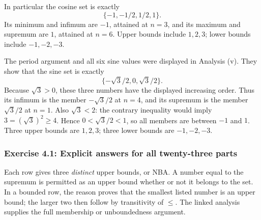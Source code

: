 In particular the cosine set is exactly
\[
 \{-1,-1/2,1/2,1\}.
\]
Its minimum and infimum are $-1$, attained at $n=3$, and its
maximum and supremum are $1$, attained at $n=6$. Upper bounds
include $1,2,3$; lower bounds include $-1,-2,-3$.

\label{bounds:w}
The period argument and all six sine values were displayed in
Analysis (v). They show that the sine set is exactly
\[
 \{-\sqrt3/2,0,\sqrt3/2\}.
\]
Because $\sqrt3>0$, these three numbers have the displayed
increasing order. Thus its infimum is the member $-\sqrt3/2$
at $n=4$, and its supremum is the member $\sqrt3/2$ at $n=1$.
Also $\sqrt3<2$: the contrary inequality would imply
$3=(\sqrt3)^2\geq4$. Hence $0<\sqrt3/2<1$, so all members
are between $-1$ and $1$. Three upper bounds are $1,2,3$;
three lower bounds are $-1,-2,-3$.

\subsubsection*{Exercise 4.1: Explicit answers for all twenty-three parts}

Each row gives three \emph{distinct} upper bounds, or NBA. A number
equal to the supremum is permitted as an upper bound whether or not
it belongs to the set. In a bounded row, the reason proves that the
smallest listed number is an upper bound; the larger two then follow
by transitivity of $\leq$. The linked analysis supplies the full
membership or unboundedness argument.

